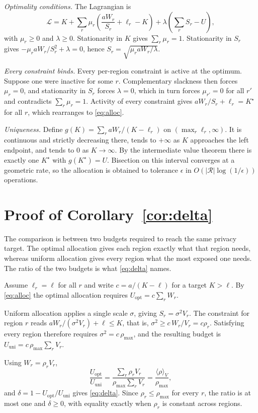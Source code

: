 \documentclass[acmsmall,screen,review,anonymous]{acmart}
\theoremstyle{acmdefinition}%
\newcommand{\Reg}{\mathcal{R}}
\begin{document}
\emph{Optimality conditions.} The Lagrangian is
\begin{equation}
\mathcal{L} = K + \sum_r \mu_r \left( \frac{a W_r}{S_r} + \ell_r - K \right)
+ \lambda \left( \sum_r S_r - U \right),
\end{equation}
with $\mu_r \ge 0$ and $\lambda \ge 0$. Stationarity in $K$ gives $\sum_r \mu_r =
1$. Stationarity in $S_r$ gives $-\mu_r a W_r / S_r^2 + \lambda = 0$, hence $S_r =
\sqrt{\mu_r a W_r / \lambda}$.

\emph{Every constraint binds.} Every per-region constraint is active at the
optimum. Suppose one were inactive for some $r$. Complementary slackness then
forces $\mu_r = 0$, and stationarity in $S_r$ forces $\lambda = 0$, which in turn
forces $\mu_{r'} = 0$ for all $r'$ and contradicts $\sum_r \mu_r = 1$. Activity of
every constraint gives $a W_r / S_r + \ell_r = K^{\star}$ for all $r$, which
rearranges to \eqref{eq:alloc}.

\emph{Uniqueness.} Define $g(K) = \sum_r a W_r / (K - \ell_r)$ on $(\max_r \ell_r,
\infty)$. It is continuous and strictly decreasing there, tends to $+\infty$ as
$K$ approaches the left endpoint, and tends to $0$ as $K \to \infty$. By the
intermediate value theorem there is exactly one $K^{\star}$ with $g(K^{\star}) =
U$. Bisection on this interval converges at a geometric rate, so the allocation is
obtained to tolerance $\epsilon$ in $O(|\Reg| \log(1/\epsilon))$ operations.

\section{Proof of Corollary~\ref{cor:delta}}
\label{app:delta}

The comparison is between two budgets required to reach the same privacy target.
The optimal allocation gives each region exactly what that region needs, whereas
uniform allocation gives every region what the most exposed one needs. The ratio
of the two budgets is what \eqref{eq:delta} names.

Assume $\ell_r = \ell$ for all $r$ and write $c = a / (K - \ell)$ for a target $K
> \ell$. By \eqref{eq:alloc} the optimal allocation requires $U_{\mathrm{opt}} = c
\sum_r W_r$.

Uniform allocation applies a single scale $\sigma$, giving $S_r = \sigma^2 V_r$.
The constraint for region $r$ reads $a W_r / (\sigma^2 V_r) + \ell \le K$, that is,
$\sigma^2 \ge c \, W_r / V_r = c \rho_r$. Satisfying every region therefore
requires $\sigma^2 = c \, \rho_{\max}$, and the resulting budget is
$U_{\mathrm{uni}} = c \, \rho_{\max} \sum_r V_r$.

Using $W_r = \rho_r V_r$,
\begin{equation}
\frac{U_{\mathrm{opt}}}{U_{\mathrm{uni}}}
= \frac{\sum_r \rho_r V_r}{\rho_{\max} \sum_r V_r}
= \frac{\langle \rho \rangle_V}{\rho_{\max}},
\end{equation}
and $\delta = 1 - U_{\mathrm{opt}} / U_{\mathrm{uni}}$ gives \eqref{eq:delta}.
Since $\rho_r \le \rho_{\max}$ for every $r$, the ratio is at most one and $\delta
\ge 0$, with equality exactly when $\rho_r$ is constant across regions.
\end{document}
